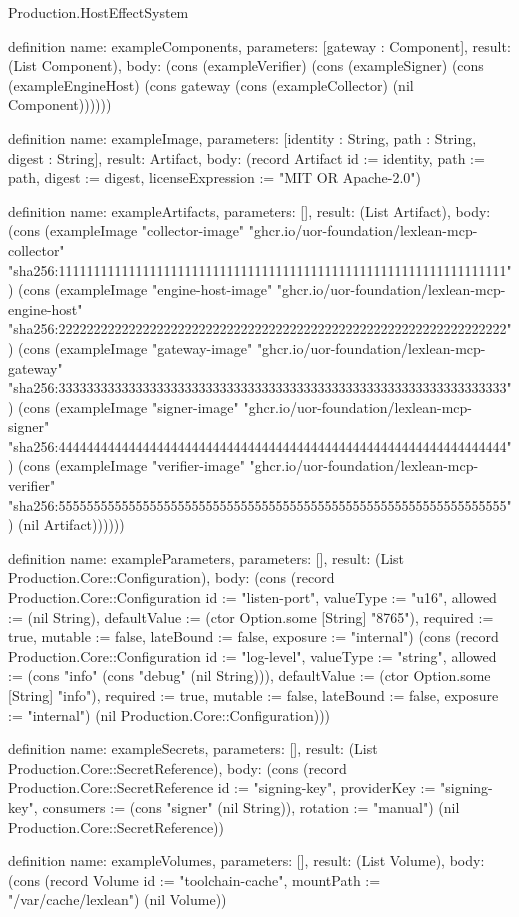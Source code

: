 \begin{lexlean}{Production.HostEffectSystem}
\begin{semanticmodule}
definition{
  name: exampleComponents,
  parameters: [gateway : Component],
  result: (List Component),
  body: (cons (exampleVerifier) (cons (exampleSigner) (cons (exampleEngineHost) (cons gateway (cons (exampleCollector) (nil Component))))))
}

definition{
  name: exampleImage,
  parameters: [identity : String, path : String, digest : String],
  result: Artifact,
  body: (record Artifact {id := identity, path := path, digest := digest, licenseExpression := "MIT OR Apache-2.0"})
}

definition{
  name: exampleArtifacts,
  parameters: [],
  result: (List Artifact),
  body: (cons (exampleImage "collector-image" "ghcr.io/uor-foundation/lexlean-mcp-collector" "sha256:1111111111111111111111111111111111111111111111111111111111111111") (cons (exampleImage "engine-host-image" "ghcr.io/uor-foundation/lexlean-mcp-engine-host" "sha256:2222222222222222222222222222222222222222222222222222222222222222") (cons (exampleImage "gateway-image" "ghcr.io/uor-foundation/lexlean-mcp-gateway" "sha256:3333333333333333333333333333333333333333333333333333333333333333") (cons (exampleImage "signer-image" "ghcr.io/uor-foundation/lexlean-mcp-signer" "sha256:4444444444444444444444444444444444444444444444444444444444444444") (cons (exampleImage "verifier-image" "ghcr.io/uor-foundation/lexlean-mcp-verifier" "sha256:5555555555555555555555555555555555555555555555555555555555555555") (nil Artifact))))))
}

definition{
  name: exampleParameters,
  parameters: [],
  result: (List Production.Core::Configuration),
  body: (cons (record Production.Core::Configuration {id := "listen-port", valueType := "u16", allowed := (nil String), defaultValue := (ctor Option.some [String] "8765"), required := true, mutable := false, lateBound := false, exposure := "internal"}) (cons (record Production.Core::Configuration {id := "log-level", valueType := "string", allowed := (cons "info" (cons "debug" (nil String))), defaultValue := (ctor Option.some [String] "info"), required := true, mutable := false, lateBound := false, exposure := "internal"}) (nil Production.Core::Configuration)))
}

definition{
  name: exampleSecrets,
  parameters: [],
  result: (List Production.Core::SecretReference),
  body: (cons (record Production.Core::SecretReference {id := "signing-key", providerKey := "signing-key", consumers := (cons "signer" (nil String)), rotation := "manual"}) (nil Production.Core::SecretReference))
}

definition{
  name: exampleVolumes,
  parameters: [],
  result: (List Volume),
  body: (cons (record Volume {id := "toolchain-cache", mountPath := "/var/cache/lexlean"}) (nil Volume))
}


\end{semanticmodule}
\end{lexlean}
